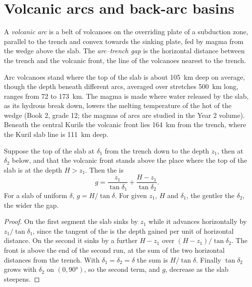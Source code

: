 \section{Volcanic arcs and back-arc basins}\label{sec:b1:active-margins:arcs}

\begin{definition}\label{def:b1:active-margins:volcanic-arc}
A \emph{volcanic arc} is a belt of volcanoes on the
overriding plate of a subduction zone, parallel to the trench and convex
towards the sinking plate, fed by magma from the  wedge above the slab.
The \emph{arc--trench gap} is the horizontal distance
between the trench and the volcanic front, the line of the volcanoes nearest
to the trench.
\end{definition}

Arc volcanoes stand where the top of the slab is about \qty{105}{km} deep on
average, though the depth beneath different arcs, averaged over stretches
\qty{500}{km} long, ranges from 72 to \qty{173}{km}. The magma is
made where water released by the slab, as its hydrous  break down,
lowers the melting temperature of the hot  of the wedge (Book 2, grade
12; the magmas of arcs are studied in the Year 2 volume). Beneath the
central Kurils the volcanic front lies \qty{164}{km} from the trench, where the
Kuril slab line is \qty{111}{km} deep.

\begin{proposition}\label{prop:b1:active-margins:gap}
Suppose the top of the slab  at $\delta_1$ from the trench down to the
depth $z_1$, then at $\delta_2$ below, and that the volcanic front stands
above the place where the top of the slab is at the depth $H > z_1$. Then the
 is
\[
  g = \frac{z_1}{\tan\delta_1} + \frac{H - z_1}{\tan\delta_2} .
\]
For a slab of uniform  $\delta$, $g = H/\tan\delta$. For given $z_1$, $H$
and $\delta_1$, the gentler the  $\delta_2$, the wider the gap.
\end{proposition}

\begin{proof}
On the first segment the slab sinks by $z_1$ while it advances horizontally by
$z_1/\tan\delta_1$, since the tangent of the  is the depth gained per unit
of horizontal distance. On the second it sinks by a further $H - z_1$ over
$(H - z_1)/\tan\delta_2$. The front is above the end of the second run, at the
sum of the two horizontal distances from the trench. With $\delta_1 = \delta_2
= \delta$ the sum is $H/\tan\delta$. Finally $\tan\delta_2$ grows with
$\delta_2$ on $(0, \ang{90})$, so the second term, and $g$, decrease as the slab
steepens.
\end{proof}

